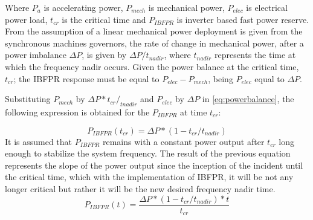 Where $ P_a $ is accelerating power, $ P_{mech} $ is mechanical power, $ P_{elec} $ is electrical power load, $ t_{cr} $ is the critical time and $ P_{IBFPR} $ is inverter based fast power reserve.
From the assumption of a linear mechanical power deployment is given from the synchronous machines governors, the rate of change in mechanical power, after a power imbalance $ \Delta P $, is given by $ \Delta P/t_{nadir} $, where $ t_{nadir} $ represents the time at which the frequency nadir occurs. Given the power balance at the critical time, $ t_{cr} $; the IBFPR response must be equal to $ P_{elec}-P_{mech} $, being $ P_{elec} $ equal to $ \Delta P $. %


Substituting $ P_{mech} $ by $ \Delta P* t_{cr} /_{tnadir} $ and $ P_{elec} $ by $ \Delta P $ in \eqref{eq:powerbalance}, the following expression is obtained for the $ P_{IBFPR} $ at time $ t_{cr} $:

\begin{equation}
	\label{eq:p_at_tcr}
	P_{IBFPR} (t_{cr} )=\Delta P*(1-t_{cr}/t_{nadir} )
\end{equation}
It is assumed that $ P_{IBFPR} $ remains with a constant power output after $ t_{cr} $ long enough to stabilize the system frequency. The result of the previous equation represents the slope of the power output since the inception of the incident until the critical time, which with the implementation of IBFPR, it will be not any longer critical but rather it will be the new desired frequency nadir time.
\begin{equation}
	\label{eq:IBFPR}
	P_{IBFPR} (t)=\dfrac{\Delta P*(1-t_{cr}/t_{nadir} )*t}{t_{cr}}
\end{equation}

